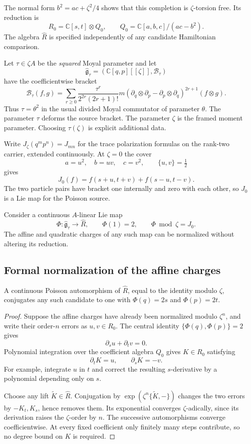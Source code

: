 The normal
form $b^2=ac+\zeta^2/4$ shows that this completion is $\zeta$-torsion
free. Its reduction is
\[
 R_0=\mathbb C[s,t]\otimes Q_0,
 \qquad Q_0=\mathbb C[a,b,c]/(ac-b^2).
\]
The algebra $\widehat R$ is specified independently of any candidate
Hamiltonian comparison.

Let $\tau\in\zeta A$ be the \emph{squared} Moyal parameter and let
\[
 \widehat{\mathfrak g}_\tau=
   (\mathbb C[q,p][[\zeta]],\mathcal B_\tau)
\]
have the coefficientwise bracket
\[
 \mathcal B_\tau(f,g)=\sum_{r\ge0}
 \frac{\tau^r}{2^{2r}(2r+1)!}
 m\left(\partial_q\otimes\partial_p-
        \partial_p\otimes\partial_q\right)^{2r+1}(f\otimes g).
\]
Thus $\tau=\theta^2$ in the usual divided Moyal commutator of
parameter $\theta$. The parameter $\tau$ deforms the source
bracket. The parameter $\zeta$ is the framed moment parameter. Choosing
$\tau(\zeta)$ is explicit additional data.

Write $J_\zeta(q^mp^n)=J_{mn}$ for the trace polarization formulas
on the rank-two carrier, extended continuously. At $\zeta=0$ the
cover
\[
 a=u^2,\quad b=uv,\quad c=v^2,\qquad\{u,v\}=\tfrac12
\]
gives
\[
 J_0(f)=f(s+u,t+v)+f(s-u,t-v).
\]
The two particle pairs have bracket one internally and zero with
each other, so $J_0$ is a Lie map for the Poisson source.

Consider a continuous $A$-linear Lie map
\[
 \Phi:\widehat{\mathfrak g}_\tau\longrightarrow\widehat R,
 \qquad \Phi(1)=2,\qquad\Phi\bmod\zeta=J_0.
\]
The affine and quadratic charges of any such map can be normalized
without altering its reduction.

\subsection{Formal normalization of the affine charges}

\begin{lemma}\label{mht:frgl:lem:affine-normalization}
A continuous Poisson automorphism of $\widehat R$, equal to the
identity modulo $\zeta$, conjugates any such candidate to one with
$\Phi(q)=2s$ and $\Phi(p)=2t$.
\end{lemma}

\begin{proof}
Suppose the affine charges have already been normalized modulo
$\zeta^n$, and write their order-$n$ errors as $u,v\in R_0$.
The central identity $\{\Phi(q),\Phi(p)\}=2$ gives
\[
 \partial_su+\partial_tv=0.
\]
Polynomial integration over the coefficient algebra $Q_0$ gives
$K\in R_0$ satisfying
\[
 \partial_tK=u,\qquad\partial_sK=-v.
\]
For example, integrate $u$ in $t$ and correct the resulting
$s$-derivative by a polynomial depending only on $s$.

Choose any lift $\widetilde K\in\widehat R$.
Conjugation by $\exp(\zeta^n\{\widetilde K,-\})$ changes the
two errors by $-K_t,K_s$, hence removes them. Its exponential
converges $\zeta$-adically, since its derivation raises the
$\zeta$-order by $n$. The successive automorphisms converge
coefficientwise. At every fixed coefficient only finitely many
steps contribute, so no degree bound on $K$ is required.
\end{proof}

